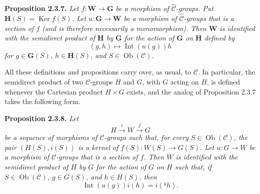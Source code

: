 \medskip
\noindent\textbf{Proposition 2.3.7.}
\textit{Let \(f:\mathbf W\to\mathbf G\) be a morphism of
\(\widehat{\mathscr C}\)-groups. Put
\(\mathbf H(S)=\operatorname{Ker}f(S)\). Let
\(u:\mathbf G\to\mathbf W\) be a morphism of
\(\widehat{\mathscr C}\)-groups that is a section of \(f\) (and is
therefore necessarily a monomorphism). Then \(\mathbf W\) is identified
with the semidirect product of \(\mathbf H\) by \(\mathbf G\) for the
action of \(\mathbf G\) on \(\mathbf H\) defined by
\[
  (g,h)\longmapsto\operatorname{Int}(u(g))h
\]
for \(g\in\mathbf G(S)\), \(h\in\mathbf H(S)\), and
\(S\in\operatorname{Ob}(\mathscr C)\).}

All these definitions and propositions carry over, as usual, to
\(\mathscr C\). In particular, the semidirect product of two
\(\mathscr C\)-groups \(H\) and \(G\), with \(G\) acting on \(H\), is
defined whenever the Cartesian product \(H\times G\) exists, and the
analog of Proposition 2.3.7 takes the following form.

\medskip
\noindent\textbf{Proposition 2.3.8.}
\textit{Let
\[
  H\xrightarrow{i}W\xrightarrow{f}G
\]
be a sequence of morphisms of \(\mathscr C\)-groups such that, for every
\(S\in\operatorname{Ob}(\mathscr C)\), the pair \((H(S),i(S))\) is a
kernel of \(f(S):W(S)\to G(S)\). Let \(u:G\to W\) be a morphism of
\(\mathscr C\)-groups that is a section of \(f\). Then \(W\) is
identified with the semidirect product of \(H\) by \(G\) for the action
of \(G\) on \(H\) such that, if \(S\in\operatorname{Ob}(\mathscr C)\),
\(g\in G(S)\), and \(h\in H(S)\), then
\[
  \operatorname{Int}(u(g))i(h)=i({}^{g}h).
\]}

